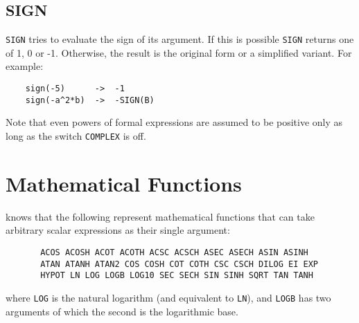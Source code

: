 \subsection{SIGN}
\hypertarget{operator:SIGN}{}
{\tt SIGN} tries to evaluate the sign of its argument. If this
is possible {\tt SIGN} returns one of 1, 0 or -1.  Otherwise, the result
is the original form or a simplified variant. For example:
\begin{verbatim}
	sign(-5)      ->  -1
	sign(-a^2*b)  ->  -SIGN(B)
\end{verbatim}
Note that even powers of formal expressions are assumed to be
positive only as long as the switch {\tt COMPLEX} is off.

\section{Mathematical Functions}
\hypertarget{operator:ACOS}{}
\hypertarget{operator:ACOSH}{}
\hypertarget{operator:ACOT}{}
\hypertarget{operator:ACOTH}{}
\hypertarget{operator:ACSC}{}
\hypertarget{operator:ACSCH}{}
\hypertarget{operator:ASEC}{}
\hypertarget{operator:ASECH}{}
\hypertarget{operator:ASIN}{}
\hypertarget{operator:ASINH}{}
\hypertarget{operator:ATAN}{}
\hypertarget{operator:ATANH}{}
\hypertarget{operator:ATAN2}{}
\hypertarget{operator:COS}{}
\hypertarget{operator:COSH}{}
\hypertarget{operator:COT}{}
\hypertarget{operator:COTH}{}
\hypertarget{operator:CSC}{}
\hypertarget{operator:CSCH}{}
\hypertarget{operator:DILOG}{}
\hypertarget{operator:EI}{}
\hypertarget{operator:EXP}{}
\hypertarget{operator:HYPOT}{}
\hypertarget{operator:LN}{}
\hypertarget{operator:LOG}{}
\hypertarget{operator:LOGB}{}
\hypertarget{operator:LOG10}{}
\hypertarget{operator:SEC}{}
\hypertarget{operator:SECH}{}
\hypertarget{operator:SIN}{}
\hypertarget{operator:SINH}{}
\hypertarget{operator:SQRT}{}
\hypertarget{operator:TAN}{}
\hypertarget{operator:TANH}{}

{\REDUCE} knows that the following represent mathematical functions
 that can
take arbitrary scalar expressions as their single argument:
\begin{verbatim}
       ACOS ACOSH ACOT ACOTH ACSC ACSCH ASEC ASECH ASIN ASINH
       ATAN ATANH ATAN2 COS COSH COT COTH CSC CSCH DILOG EI EXP
       HYPOT LN LOG LOGB LOG10 SEC SECH SIN SINH SQRT TAN TANH
\end{verbatim}
where {\tt LOG} is the natural logarithm (and equivalent to {\tt LN}),
and {\tt LOGB} has two arguments of which the second is the logarithmic base.

